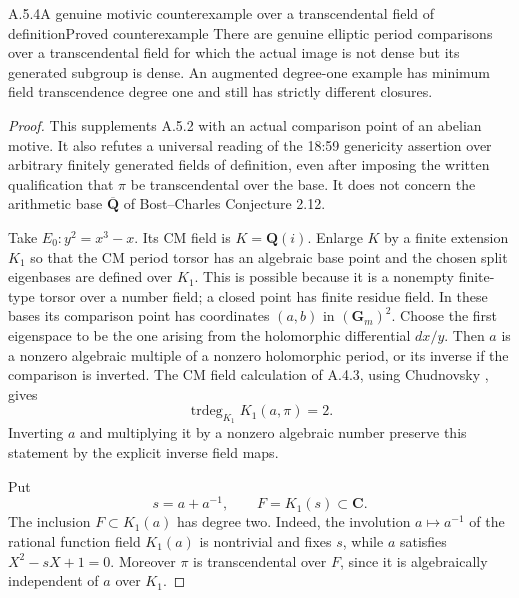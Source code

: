 \begin{result}{A.5.4}{A genuine motivic counterexample over a transcendental field of definition}{Proved counterexample}
There are genuine elliptic period comparisons over a transcendental field for which the actual image is not dense but its generated subgroup is dense. An augmented degree-one example has minimum field transcendence degree one and still has strictly different closures.
\end{result}
\begin{proof}
This supplements A.5.2 with
an actual comparison point of an abelian motive. It also refutes a universal
reading of the 18:59 genericity assertion over arbitrary finitely generated
fields of definition, even after imposing the written qualification that
\(\pi\) be transcendental over the base. It does not concern the arithmetic
base \(\overline{\mathbf Q}\) of Bost--Charles Conjecture 2.12.

Take \(E_0:y^2=x^3-x\). Its CM field is \(K=\mathbf Q(i)\). Enlarge
\(K\) by a finite extension \(K_1\) so that the CM period torsor has an
algebraic base point and the chosen split eigenbases are defined over
\(K_1\). This is possible because it is a nonempty finite-type torsor
over a number field; a closed point has finite residue field. In these
bases its comparison point has coordinates \((a,b)\) in
\((\mathbf G_m)^2\). Choose the first eigenspace to be the one arising
from the holomorphic differential \(dx/y\). Then \(a\) is a nonzero
algebraic multiple of a nonzero holomorphic period, or its inverse if the
comparison is inverted. The CM field calculation of A.4.3, using Chudnovsky \cite[\S2A, Theorem 1, p.343]{EllChudnovsky1978}, gives
\[
\operatorname{trdeg}_{K_1}K_1(a,\pi)=2.
\]
Inverting \(a\) and multiplying it by a nonzero algebraic number preserve
this statement by the explicit inverse field maps.

Put
\[
s=a+a^{-1},\qquad F=K_1(s)\subset\mathbf C.
\]
The inclusion \(F\subset K_1(a)\) has degree two. Indeed, the involution
\(a\mapsto a^{-1}\) of the rational function field \(K_1(a)\) is
nontrivial and fixes \(s\), while \(a\) satisfies
\(X^2-sX+1=0\). Moreover \(\pi\) is transcendental over \(F\), since
it is algebraically independent of \(a\) over \(K_1\).


\end{proof}
